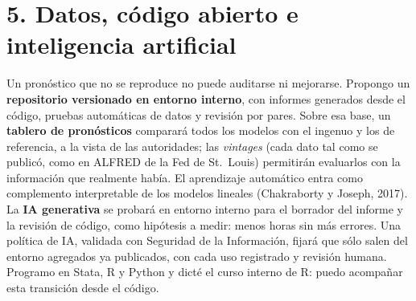 \documentclass[11pt,a4paper]{article}
\begin{document}
\section*{5. Datos, código abierto e inteligencia artificial}
Un pronóstico que no se reproduce no puede auditarse ni mejorarse. Propongo un \textbf{repositorio versionado en entorno interno}, con informes generados desde el código, pruebas automáticas de datos y revisión por pares. Sobre esa base, un \textbf{tablero de pronósticos} comparará todos los modelos con el ingenuo y los de referencia, a la vista de las autoridades; las \emph{vintages} (cada dato tal como se publicó, como en ALFRED de la Fed de St.~Louis) permitirán evaluarlos con la información que realmente había. El aprendizaje automático entra como complemento interpretable de los modelos lineales (Chakraborty y Joseph, 2017). La \textbf{IA generativa} se probará en entorno interno para el borrador del informe y la revisión de código, como hipótesis a medir: menos horas sin más errores. Una política de IA, validada con Seguridad de la Información, fijará que sólo salen del entorno agregados ya publicados, con cada uso registrado y revisión humana. Programo en Stata, R y Python y dicté el curso interno de R: puedo acompañar esta transición desde el código.
\end{document}
